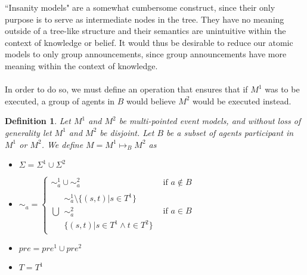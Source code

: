 \documentclass[12pt, a4paper, titlepage]{scrartcl}
\newtheorem{defn}{Definition}
\begin{document}
``Insanity models" are a somewhat cumbersome construct, since their only purpose
is to serve as intermediate nodes in the tree.
They have no meaning outside of a tree-like structure and their semantics are
unintuitive within the context of knowledge or belief.
It would thus be desirable to reduce our atomic models to only group
announcements, since group announcements have more meaning within the context of
knowledge.\\
\\
In order to do so, we must define an operation that ensures that if $M^1$ was to
be executed, a group of agents in $B$ would believe $M^2$ would be executed
instead.
\begin{defn} \label{possTwo}
Let $M^1$ and $M^2$ be multi-pointed event models, and without loss of
generality let $M^1$ and $M^2$ be disjoint.
Let $B$ be a subset of agents participant in $M^1$ or $M^2$.
We define $M = M^1 \mapsto_B M^2$ as 
\begin{itemize}
  \item $\Sigma = \Sigma^1 \cup \Sigma^2$
  \item $\sim_a =
  \begin{cases}
    \sim^1_a \cup \sim^2_a & \text{if } a \notin B \\
    \bigcup \begin{array}{c}
      \sim^1_a \setminus \{(s,t) | s \in T^1 \} \\
      \sim^2_a \\
      \{(s,t) | s \in T^1 \land t \in T^2 \}
    \end{array} & \text{if } a \in B 
  \end{cases}$
  \item $pre = pre^1 \cup pre^2$
  \item $T = T^1$
\end{itemize}
\end{defn}
\end{document}
